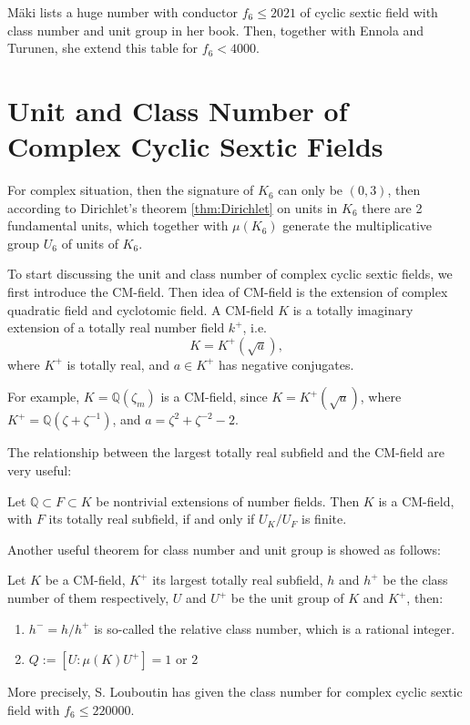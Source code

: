 M\"{a}ki lists a huge number with conductor $f_6\leq 2021$ of cyclic sextic field with class number and unit group in her book. Then, together with Ennola and Turunen, she extend this table for $f_6<4000$.


\section{Unit and Class Number of Complex Cyclic Sextic Fields}\label{sec:unitccsf}
For complex situation, then the signature of $K_6$ can only be $(0,3)$, then according to Dirichlet's theorem \ref{thm:Dirichlet} on units in $K_6$ there are 2 fundamental
units, which together with $\mu(K_6)$ generate the multiplicative group $U_6$ of units of $K_6$.

To start discussing the unit and class number of complex cyclic sextic fields,  we first introduce the CM-field. Then idea of CM-field is the extension of complex quadratic field and cyclotomic field.  A CM-field $K$ is a totally imaginary extension of a totally real number field $k^+$, i.e. $$K=K^+(\sqrt{a}),$$ where $K^+$ is totally real, and $a\in K^+$ has negative conjugates.

For example, $K=\mathbb{Q}(\zeta_m)$ is a CM-field, since $K=K^+(\sqrt{a})$, where $K^+=\mathbb{Q}(\zeta+\zeta^{-1})$, and $a=\zeta^2+\zeta^{-2}-2$.

The relationship between the largest totally real subfield and the CM-field are very useful:
\begin{theorem} 
Let $\mathbb{Q}\subset F\subset K$ be nontrivial extensions of number fields. Then $K$ is a CM-field, with $F$ its totally real subfield, if and only if $U_K/U_F$ is finite.
\end{theorem}

Another useful theorem \citep{Xianke2006ANT} for class number and unit group is showed as follows:
\begin{theorem}\label{thm:unitcomplexsec}
Let $K$ be a CM-field, $K^+$ its largest totally real subfield, $h$ and $h^+$ be the class number of them respectively, $U$ and $U^+$ be the unit group of $K$ and $K^+$, then: 
\begin{enumerate}
\item $h^-=h/h^+$ is so-called the relative class number, which is a rational integer.
\item $Q:=[U:\mu(K)U^+]=1\text{ or }2$
\end{enumerate} 
\end{theorem}

More precisely, S. Louboutin has given the class number for complex cyclic sextic field  with $f_6\leq 220000$.